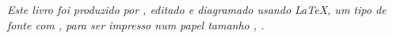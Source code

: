 \cleardoublepage

\null
\vfill
\newpage

\null
\vfill
\thispagestyle{empty}


{\normalsize \it Este livro foi produzido por \myauthor, editado e diagramado usando \LaTeX,
um tipo de fonte com \showfont,
para ser impresso num papel tamanho \imprimirpapersize,  \imprimirdata.
\vspace*{4pt}}






